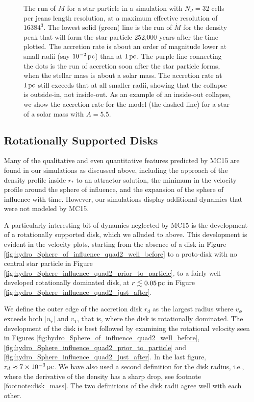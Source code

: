 \documentclass[../dissertation.tex]{subfiles}
\begin{document}
%
\begin{figure}[htb]
\caption[Hydro Run of Mass Accretion Rate]{\label{fig:hydro_Mdot_vs_shu}}The run of $\dot{M}$ for a star particle in a simulation with $N_J=32$ cells per jeans length resolution, at a maximum effective resolution of $16384^3$. The lowest solid (green) line is the run of $\dot{M}$  for the density peak that will form the star particle 252,000 years after the time plotted. The accretion rate is about an order of magnitude lower at small radii (say $10^{-2}\,\rm pc$) than at $1\,\rm pc$. The purple line connecting the dots is the run of accretion soon after the star particle forms, when the stellar mass is about a solar mass. The accretion rate at $1\,\rm pc$ still exceeds that at all smaller radii, showing that the collapse is outside-in, not inside-out. As an example of an inside-out collapse, we show the accretion rate for the \citet{1977ApJ...214..488S} model (the dashed line) for a star of a solar mass with $A = 5.5$. 
\end{figure}
%


\subsection{Rotationally Supported Disks}
\label{sec:hydro_Rotationally_supported_disks}
Many of the qualitative and even quantitative features predicted by MC15 are 
found in our simulations as discussed above, including the approach of the 
density profile inside $r_*$ to an attractor 
solution, the minimum in the velocity profile around the sphere of influence, 
and the expansion of the sphere of influence with time.
However, our simulations display additional dynamics that were not modeled by MC15.  

A particularly interesting bit of dynamics neglected by MC15 is the 
development of a rotationally supported disk, which we alluded to above.
This development is evident in the velocity plots, starting from the absence of a disk in 
Figure \ref{fig:hydro_Sphere_of_influence_quad2_well_before} to a proto-disk 
with no central star particle in Figure 
\ref{fig:hydro_Sphere_influence_quad2_prior_to_particle}, to a fairly well 
developed rotationally dominated disk, at $r \lesssim 0.05 \,\rm pc$ in 
Figure \ref{fig:hydro_Sphere_influence_quad2_just_after}. 

We define the outer edge of the accretion disk $r_d$ as the largest radius 
where $v_\phi$ exceeds both $|u_r|$ and $v_T$, that is, where the 
disk is rotationally dominated. The development of the disk is best followed 
by examining the rotational velocity seen in 
Figures \ref{fig:hydro_Sphere_of_influence_quad2_well_before},
\ref{fig:hydro_Sphere_influence_quad2_prior_to_particle} and
\ref{fig:hydro_Sphere_influence_quad2_just_after}. In the last 
figure, $r_d\approx7\times10^{-3}\,\rm pc$. 
We have also used a second definition for the disk radius, i.e., 
where the derivative of the density has a sharp drop, see footnote \ref{footnote:disk_mass}. The two definitions of the disk radii agree 
well with each other.
\end{document}
